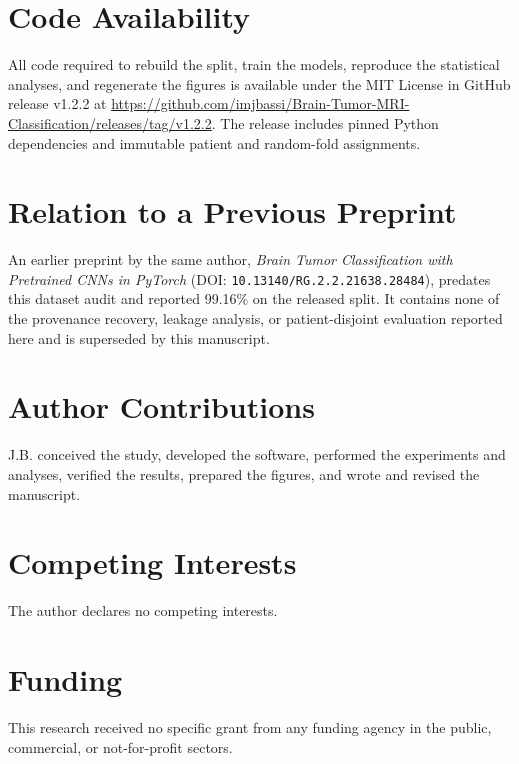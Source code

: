 ﻿\documentclass[11pt]{article}
\begin{document}
\section*{Code Availability}
All code required to rebuild the split, train the models, reproduce the statistical analyses, and regenerate the figures is available under the MIT License in GitHub release v1.2.2 at \url{https://github.com/imjbassi/Brain-Tumor-MRI-Classification/releases/tag/v1.2.2}. The release includes pinned Python dependencies and immutable patient and random-fold assignments.

\section*{Relation to a Previous Preprint}
An earlier preprint by the same author, \textit{Brain Tumor Classification with Pretrained CNNs in PyTorch} (DOI: \texttt{10.13140/RG.2.2.21638.28484}), predates this dataset audit and reported 99.16\% on the released split. It contains none of the provenance recovery, leakage analysis, or patient-disjoint evaluation reported here and is superseded by this manuscript.

\section*{Author Contributions}
J.B. conceived the study, developed the software, performed the experiments and analyses, verified the results, prepared the figures, and wrote and revised the manuscript.

\section*{Competing Interests}
The author declares no competing interests.

\section*{Funding}
This research received no specific grant from any funding agency in the public, commercial, or not-for-profit sectors.
\end{document}

